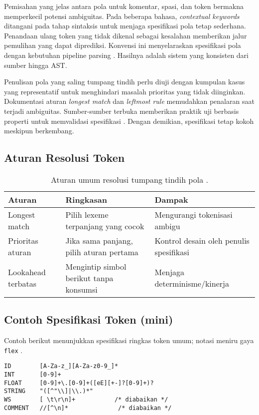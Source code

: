 \documentclass[../main.tex]{subfiles}
\begin{document}
Pemisahan yang jelas antara pola untuk komentar, spasi, dan token bermakna memperkecil potensi ambiguitas. Pada beberapa bahasa, \emph{contextual keywords} ditangani pada tahap sintaksis untuk menjaga spesifikasi pola tetap sederhana. Penandaan ulang token yang tidak dikenal sebagai kesalahan memberikan jalur pemulihan yang dapat diprediksi. Konvensi ini menyelaraskan spesifikasi pola dengan kebutuhan pipeline parsing \citep{FlexManual}. Hasilnya adalah sistem yang konsisten dari sumber hingga AST.

Penulisan pola yang saling tumpang tindih perlu diuji dengan kumpulan kasus yang representatif untuk menghindari masalah prioritas yang tidak diinginkan. Dokumentasi aturan \emph{longest match} dan \emph{leftmost rule} memudahkan penalaran saat terjadi ambiguitas. Sumber-sumber terbuka memberikan praktik uji berbasis properti untuk memvalidasi spesifikasi \citep{FlexManual}. Dengan demikian, spesifikasi tetap kokoh meskipun berkembang.

\subsection{Aturan Resolusi Token}
\begin{table}[t]
  \centering
  \caption{Aturan umum resolusi tumpang tindih pola \citep{FlexManual,WikiMaximalMunch}.}
  \label{tab:token-resolution}
  \begin{tabular}{@{}lll@{}}
    \toprule
    \textbf{Aturan} & \textbf{Ringkasan} & \textbf{Dampak} \\
    \midrule
    Longest match & Pilih lexeme terpanjang yang cocok & Mengurangi tokenisasi ambigu \\
    Prioritas aturan & Jika sama panjang, pilih aturan pertama & Kontrol desain oleh penulis spesifikasi \\
    Lookahead terbatas & Mengintip simbol berikut tanpa konsumsi & Menjaga determinisme/kinerja \\
    \bottomrule
  \end{tabular}
\end{table}

\subsection{Contoh Spesifikasi Token (mini)}
Contoh berikut menunjukkan spesifikasi ringkas token umum; notasi meniru gaya \texttt{flex} \citep{FlexManual,CraftingInterpreters}.
\begin{verbatim}
ID        [A-Za-z_][A-Za-z0-9_]*
INT       [0-9]+
FLOAT     [0-9]+\.[0-9]+([eE][+-]?[0-9]+)?
STRING    "([^"\\]|\\.)*"
WS        [ \t\r\n]+           /* diabaikan */
COMMENT   //[^\n]*              /* diabaikan */
\end{verbatim}
\end{document}
